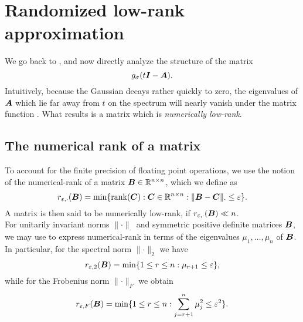 \chapter{Randomized low-rank approximation}
\label{chp:3-nystrom}

We go back to , and now
directly analyze the structure of the matrix
\begin{equation}
    g_{\sigma}(t\boldsymbol{I} - \boldsymbol{A}).
    \label{equ:3-nystrom-matrix-function}
\end{equation}
Intuitively, because the
Gaussian  
decays rather quickly to zero, the eigenvalues of $\boldsymbol{A}$ which lie far away
from $t$ on the spectrum will nearly vanish under the matrix function .
What results is a matrix which is \emph{numerically low-rank}.


\section{The numerical rank of a matrix}
\label{sec:3-nystrom-numerical-rank}

To account for the finite precision of floating point operations, we use the
notion of the \gls{numerical-rank} \cite[Definition~1.1]{noga2013rank}
of a matrix $\boldsymbol{B} \in \mathbb{R}^{n \times n}$, which we define as
\begin{equation}
    r_{\varepsilon, \cdot}(\boldsymbol{B}) = \min \{\operatorname{rank}(\boldsymbol{C}): \boldsymbol{C} \in \mathbb{R}^{n \times n}: \lVert \boldsymbol{B} - \boldsymbol{C} \rVert _{\cdot} \leq \varepsilon \}.
    \label{equ:3-nystrom-def-numerical-rank}
\end{equation}
A matrix is then said to be numerically low-rank, if $r_{\varepsilon, \cdot}(\boldsymbol{B}) \ll n$.\\ 

For unitarily invariant norms $\lVert \cdot \rVert _{\cdot}$ and 
symmetric positive definite matrices $\boldsymbol{B}$, we may use
\cite[Theorem~5]{mirsky1960truncation} to express \gls{numerical-rank} in terms
of the eigenvalues $\mu_1, \dots, \mu_n$ of $\boldsymbol{B}$.
In particular, for the spectral norm $\lVert \cdot \rVert _2$ we have
\begin{equation}
    r_{\varepsilon, 2}(\boldsymbol{B}) = \min \{1 \leq r \leq n: \mu_{r+1} \leq \varepsilon \},
    \label{equ:3-nystrom-numerical-rank-spectral-norm}
\end{equation}
while for the Frobenius norm $\lVert \cdot \rVert _F$ we obtain
\begin{equation}
    r_{\varepsilon, F}(\boldsymbol{B}) = \min \{1 \leq r \leq n: \sum_{j=r+1}^n \mu_{j}^2 \leq \varepsilon^2 \}.
    \label{equ:3-nystrom-numerical-rank-frobenius-norm}
\end{equation}\\

